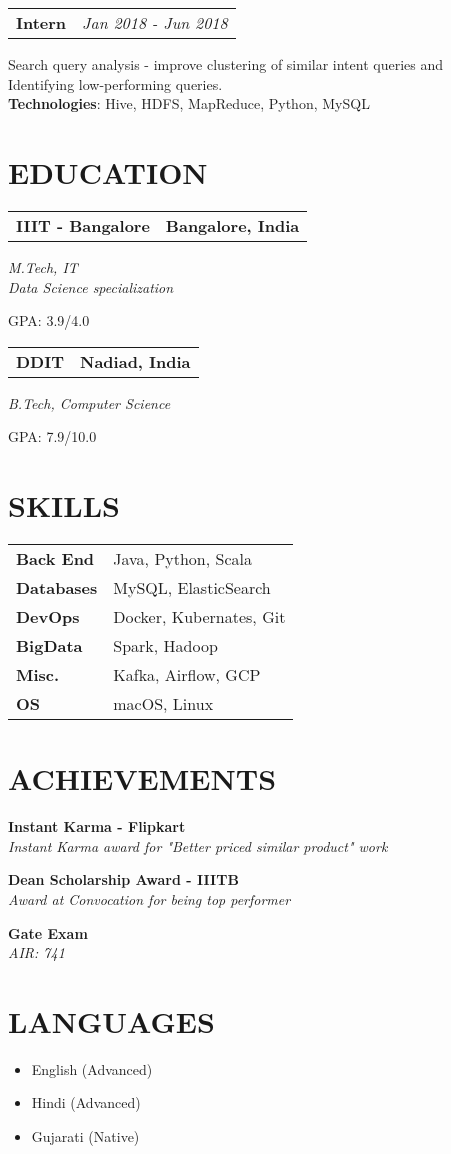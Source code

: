 \documentclass[11pt,a4paper]{moderncv}
\newcommand*{\subexperienceentry}[2]{
    \begin{tabularx}{\textwidth}{LR}
        \textbf{#1} & {\itshape #2}
    \end{tabularx}
}
\newcommand*{\educationentry}[4][0.5mm]{
    \begin{tabularx}{\textwidth}{LR}
        {\bfseries #3} & {\bfseries #4} \\
    \end{tabularx}
    {\itshape #2}
    \par\addvspace{#1}
}
\newcommand*{\scoreentry}[3][2.5mm]{
    {\bfseries #2} \\
    {\itshape #3}
    \par\addvspace{#1}
}
\begin{document}
\begin{minipage}[t]{0.62\textwidth}
\subexperienceentry{Intern}{Jan 2018 - Jun 2018}
Search query analysis - improve clustering of similar intent queries and Identifying low-performing queries. \\
\textbf {Technologies}: Hive, HDFS, MapReduce, Python, MySQL
\vspace{3.0mm}


\end{minipage}
\hfill
\begin{minipage}[t]{0.35\textwidth}

\section{EDUCATION}
\educationentry{M.Tech, IT\\Data Science specialization}{IIIT - Bangalore}{Bangalore, India}
GPA: 3.9/4.0
\par
\vspace{3.0mm}
\educationentry{B.Tech, Computer Science}{DDIT}{Nadiad, India}
GPA: 7.9/10.0

\section{SKILLS}
\begin{tabularx}{\textwidth}{>{\bfseries}l@{\hskip 3.5mm}L}
Back End & Java, Python, Scala \\
Databases & MySQL, ElasticSearch \\
DevOps & Docker, Kubernates, Git \\
BigData & Spark, Hadoop \\
Misc. & Kafka, Airflow, GCP \\
OS & macOS, Linux \\
\end{tabularx}


\section{ACHIEVEMENTS}
\scoreentry{Instant Karma - Flipkart}{Instant Karma award for "Better priced similar product" work}
\scoreentry{Dean Scholarship Award - IIITB}{Award at Convocation for being top performer}
\scoreentry{Gate Exam}{AIR: 741}


\section{LANGUAGES}
\begin{itemize}
    \item English (Advanced)
    \item Hindi (Advanced)
    \item Gujarati (Native)
\end{itemize}


\end{minipage}
\end{document}
